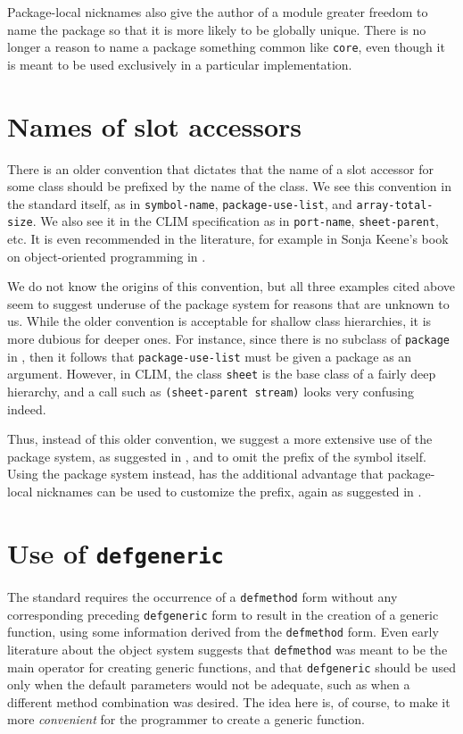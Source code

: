 Package-local nicknames also give the author of a module greater
freedom to name the package so that it is more likely to be globally
unique.  There is no longer a reason to name a package something
common like \texttt{core}, even though it is meant to be used
exclusively in a particular implementation.

\section{Names of slot accessors}

There is an older convention that dictates that the name of a slot
accessor for some class should be prefixed by the name of the class.
We see this convention in the \commonlisp{} standard itself, as in
\texttt{symbol-name}, \texttt{package-use-list}, and
\texttt{array-total-size}.  We also see it in the CLIM
specification as in \texttt{port-name}, \texttt{sheet-parent}, etc.
It is even recommended in the literature, for example in Sonja Keene's
book on object-oriented programming in \commonlisp{}
\cite{sonya-keene}.

We do not know the origins of this convention, but all three examples
cited above seem to suggest underuse of the package system for reasons
that are unknown to us.  While the older convention is acceptable for
shallow class hierarchies, it is more dubious for deeper ones.  For
instance, since there is no subclass of \texttt{package} in
\commonlisp{}, then it follows that \texttt{package-use-list} must be
given a package as an argument.  However, in CLIM, the class
\texttt{sheet} is the base class of a fairly deep hierarchy, and
a call such as \texttt{(sheet-parent stream)} looks very confusing
indeed.

Thus, instead of this older convention, we suggest a more extensive
use of the package system, as suggested in
, and to omit the prefix of
the symbol itself.  Using the package system instead, has the
additional advantage that package-local nicknames can be used to
customize the prefix, again as suggested in
.

\section{Use of \texttt{defgeneric}}

The \commonlisp{} standard requires the occurrence of a
\texttt{defmethod} form without any corresponding preceding
\texttt{defgeneric} form to result in the creation of a generic
function, using some information derived from the \texttt{defmethod}
form.  Even early literature about the \commonlisp{} object system
\cite{Paeke:1993:OOP} suggests that \texttt{defmethod} was meant to be
the main operator for creating generic functions, and that
\texttt{defgeneric} should be used only when the default parameters
would not be adequate, such as when a different method combination was
desired.  The idea here is, of course, to make it more
\emph{convenient} for the programmer to create a generic function.

